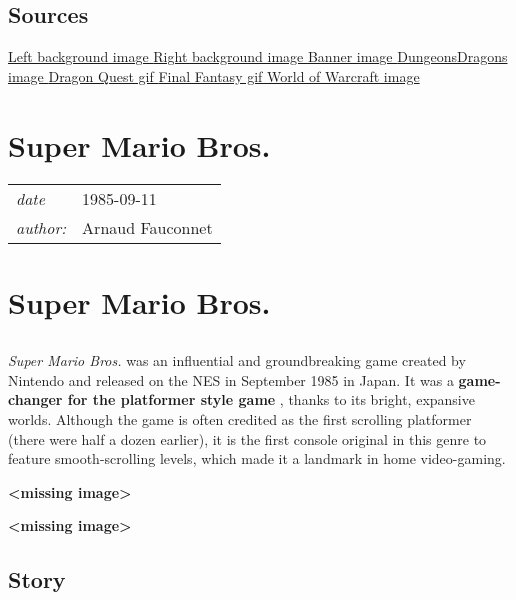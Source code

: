 \documentclass[a4paper,10pt]{book}
\newcommand{\pageHeader}[4]{
    \section{#1}
    \vspace{-0.3cm}
    \begin{table}[h!]
     \begin{tabular}{ll}
        \hline
        \textit{date} & #2 \\
        \textit{author: } & #3\\
        \hline
     \end{tabular}
    \end{table}
    \vspace{-0.3cm}
}
\begin{document}
 \subsection{Sources }
 \href{https://www.nintendo.com/content/dam/noa/en_US/games/switch/d/dragon-quest-switch/dragon-quest-switch-hero.jpg}{Left background image }  
 \href{https://www.desktopbackground.org/download/2560x1440/2014/01/17/702592_final-fantasy-1-wallpapers-wallpapers-cave_3242x2106_h.png}{Right background image }  
 \href{https://3.bp.blogspot.com/-cwGhAH4Pcz8/VwlCSERKEcI/AAAAAAAAHQ4/ni8e1V2-2201J1QoL-wU_UKn_q4C1kwjg/s640/role-playing-games.jpg}{Banner image }  
 \href{https://i.pinimg.com/736x/91/e1/64/91e164d20e3e5c9afe1bcae15e1c40dd--role-playing-games-dungeons-and-dragons.jpg}{DungeonsDragons image }  
 \href{https://miro.medium.com/max/996/0*cNrg_5iMW-BNQ7Cb.gif}{Dragon Quest gif }  
 \href{https://2.bp.blogspot.com/-WPTN9LMuMZ0/UQirYfK6KRI/AAAAAAAAcS8/Buo0hf_QZ_Q/s280/Final_Fantasy_%2528NES%2529_Replay_09.gif}{Final Fantasy gif }  
 \href{https://www.shatteredstar.com/images/screenshots/wow/bigones/BladefistRaid5.jpg}{World of Warcraft image }  
 \newpage\pageHeader{Super Mario Bros.}{1985-09-11}{Arnaud Fauconnet}{The first episode of an iconic video game series.}
 \section{Super Mario Bros. }
 \subsection{}
 
 \textit{Super
              Mario Bros. } was an influential and groundbreaking game
          created by Nintendo and released on the NES in September 1985 in
          Japan. It was a  \textbf{game-changer for the platformer style game } ,
          thanks to its bright, expansive worlds. 
 Although the game is often credited as the first scrolling
          platformer (there were half a dozen earlier), it is the first console
          original in this genre to feature smooth-scrolling levels, which made
          it a landmark in home video-gaming. 
 
 \textbf{<missing image>}
 
   \textbf{<missing image>}
 
 \subsection{Story }
 
\end{document}
